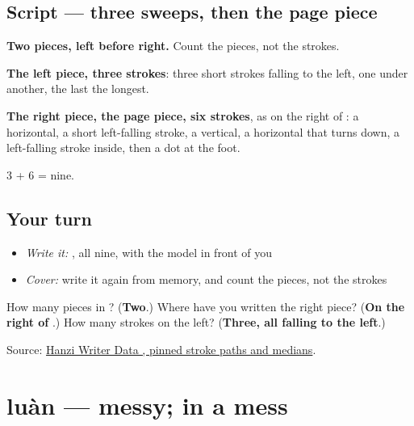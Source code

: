 \subsection*{Script — three sweeps, then the page piece}

\begin{quote}
\end{quote}

\textbf{Two pieces, left before right.} Count the pieces, not the strokes.

\textbf{The left piece, three strokes}: three short strokes falling to the left, one under another, the last the longest.

\textbf{The right piece, the page piece, six strokes}, as on the right of : a horizontal, a short left-falling stroke, a vertical, a horizontal that turns down, a left-falling stroke inside, then a dot at the foot.

3 + 6 = nine.

\subsection*{Your turn}
\begin{itemize}
\raggedright
  \item \emph{Write it:} , all nine, with the model in front of you
  \item \emph{Cover:} write it again from memory, and count the pieces, not the strokes
\end{itemize}

\begin{tcolorbox}[breakable,colback=teal!4,colframe=teal!35!black,title={Before you move on}]
How many pieces in ? (\textbf{Two}.) Where have you written the right piece? (\textbf{On the right of }.) How many strokes on the left? (\textbf{Three, all falling to the left}.)

Source: \href{https://raw.githubusercontent.com/chanind/hanzi-writer-data/68d10a4b21150cae5e1ebbd223eed289cf32d90c/data/\%E9\%A1\%BB.json}{Hanzi Writer Data , pinned stroke paths and medians}.
\end{tcolorbox}
\section[luàn]{luàn — messy; in a mess}

\label{lesson:ZH-C362-luan}



